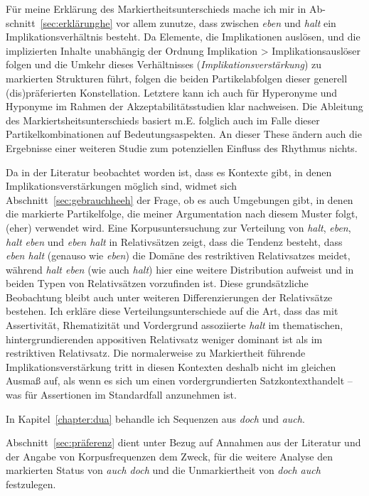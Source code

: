 Für meine Erklärung des Markiertheitsunterschieds  mache ich mir in Ab-\linebreak schnitt~\ref{sec:erklärunghe} vor allem zunutze, dass zwischen \textit{eben} und \textit{halt} ein Implikationsverhältnis  besteht. Da Elemente, die Implikationen auslösen, und die implizierten Inhalte unabhängig der Ordnung Implikation > Implikationsauslöser folgen und die Umkehr dieses Verhältnisses (\textit{Implikationsverstärkung})  zu markierten Strukturen führt, folgen die beiden Partikelabfolgen dieser generell (dis)präferierten Konstellation. Letztere kann ich auch für Hyperonyme und Hyponyme im Rahmen der Akzeptabilitätsstudien klar nachweisen. Die Ableitung des Markiertsheitsunterschieds basiert m.E. folglich auch im Falle dieser Partikelkombinationen auf Bedeutungsaspekten. An dieser These ändern auch die Ergebnisse einer wei\-teren Studie zum potenziellen Einfluss des Rhythmus nichts. 

Da in der Literatur beobachtet worden ist, dass es Kontexte gibt, in denen Im\-plikationsverstärkungen möglich sind, widmet sich Abschnitt~\ref{sec:gebrauchheeh} der Frage, ob es auch Umgebungen gibt, in denen die markierte Partikelfolge, die meiner Argumentation nach diesem Muster folgt, (eher) verwendet wird. Eine Korpusuntersuchung zur Verteilung von \textit{halt}, \textit{eben}, \textit{halt eben} und \textit{eben halt} in Relativsätzen zeigt, dass die Tendenz besteht, dass \textit{eben halt} (genauso wie \textit{eben}) die Domäne des restriktiven Relativsatzes meidet, während \textit{halt eben} (wie auch \textit{halt}) hier eine weitere Distribution aufweist und in beiden Typen von Relativsätzen vorzufinden ist. Diese grundsätzliche Beobachtung bleibt auch unter weiteren Differenzierungen der Relativsätze bestehen. Ich erkläre diese Verteilungsunterschiede auf die Art, dass das mit Assertivität, Rhematizität und Vordergrund assoziierte \textit{halt} im thematischen, hintergrundierenden appositiven Relativsatz weniger dominant ist als im restriktiven Relativsatz. Die normalerweise zu Markiertheit führende Im\-plikationsverstärkung tritt in diesen Kontexten deshalb nicht im gleichen Ausmaß auf, als wenn es sich um einen vordergrundierten Satzkontext\largerpage handelt – was für Assertionen im Standardfall anzunehmen ist.

\noindent
In Kapitel~\ref{chapter:dua} behandle ich Sequenzen aus \textit{doch} und \textit{auch}. 

Abschnitt~\ref{sec:präferenz} dient unter Bezug auf Annahmen aus der Literatur und der Angabe von Korpusfrequenzen dem Zweck, für die weitere Analyse den markierten Status von \textit{auch doch} und die Unmarkiertheit von \textit{doch auch} festzulegen.

